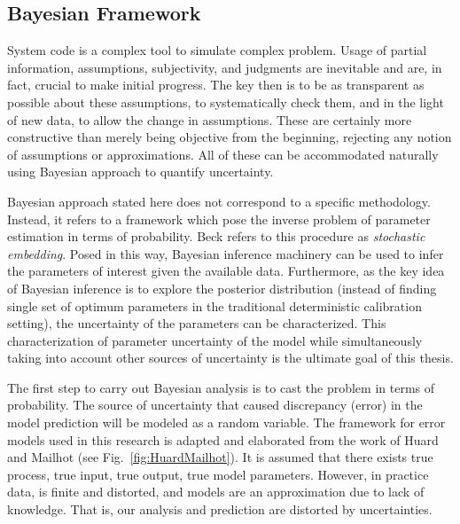 \documentclass[11pt,titlepage]{article}
\begin{document}
\subsection{Bayesian Framework}

System code is a complex tool to simulate complex problem. 
Usage of partial information, assumptions, subjectivity, and judgments are inevitable and are, in fact, crucial to make initial progress. 
The key then is to be as transparent as possible about these assumptions, to systematically check them, and in the light of new data, to allow the change in assumptions. 
These are certainly more constructive than merely being objective from the beginning, rejecting any notion of assumptions or approximations. 
All of these can be accommodated naturally using Bayesian approach to quantify uncertainty.

Bayesian approach stated here does not correspond to a specific methodology. 
Instead, it refers to a framework which pose the inverse problem of parameter estimation in terms of probability. 
Beck \cite{Beck2010} refers to this procedure as \emph{stochastic embedding}. 
Posed in this way, Bayesian inference machinery can be used to infer the parameters of interest given the available data. 
Furthermore, as the key idea of Bayesian inference is to explore the posterior distribution (instead of finding single set of optimum parameters in the traditional deterministic calibration setting), the uncertainty of the parameters can be characterized. 
This characterization of parameter uncertainty of the model while simultaneously taking into account other sources of uncertainty is the ultimate goal of this thesis. 

The first step to carry out Bayesian analysis is to cast the problem in terms of probability. 
The source of uncertainty that caused discrepancy (error) in the model prediction will be modeled as a random variable. 
The framework for error models used in this research is adapted and elaborated from the work of Huard and Mailhot \cite{HuardMailhot2006} (see Fig.~\ref{fig:HuardMailhot}). 
It is assumed that there exists true process, true input, true output, true model parameters. 
However, in practice data, is finite and distorted, and models are an approximation due to lack of knowledge. 
That is, our analysis and prediction are distorted by uncertainties. 
\end{document}
